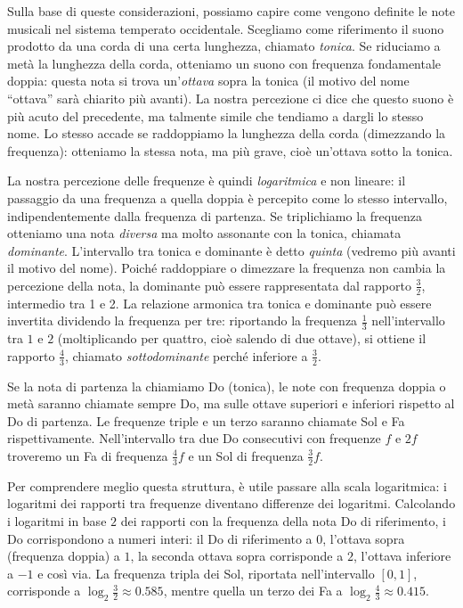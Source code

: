 Sulla base di queste considerazioni, possiamo capire come vengono definite 
le note musicali nel sistema temperato occidentale. 
Scegliamo come riferimento il suono prodotto da una corda di una certa lunghezza, 
chiamato \emph{tonica}. 
Se riduciamo a metà la lunghezza della corda, otteniamo un suono con frequenza fondamentale doppia: 
questa nota si trova un'\emph{ottava} sopra la tonica 
(il motivo del nome ``ottava'' sarà chiarito più avanti). 
La nostra percezione ci dice che questo suono è più acuto del precedente, 
ma talmente simile che tendiamo a dargli lo stesso nome. 
Lo stesso accade se raddoppiamo la lunghezza della corda (dimezzando la frequenza): 
otteniamo la stessa nota, ma più grave, cioè un’ottava sotto la tonica.

La nostra percezione delle frequenze è quindi \emph{logaritmica} e non lineare: 
il passaggio da una frequenza a quella doppia è percepito come lo stesso intervallo, 
indipendentemente dalla frequenza di partenza. 
Se triplichiamo la frequenza otteniamo una nota \emph{diversa} 
ma molto assonante con la tonica, chiamata \emph{dominante}. 
L’intervallo tra tonica e dominante è detto \emph{quinta} 
(vedremo più avanti il motivo del nome). 
Poiché raddoppiare o dimezzare la frequenza non cambia la percezione della nota, 
la dominante può essere rappresentata dal rapporto $\frac 3 2$, intermedio tra 1 e 2. 
La relazione armonica tra tonica e dominante può essere invertita dividendo la frequenza per tre: 
riportando la frequenza $\frac 1 3$ nell’intervallo tra $1$ e $2$ 
(moltiplicando per quattro, cioè salendo di due ottave), 
si ottiene il rapporto $\frac 4 3$, chiamato \emph{sottodominante} 
perché inferiore a $\frac 3 2$.


Se la nota di partenza la chiamiamo Do (tonica), 
le note con frequenza doppia o metà saranno chiamate sempre Do, 
ma sulle ottave superiori e inferiori rispetto al Do di partenza. 
Le frequenze triple e un terzo saranno chiamate Sol e Fa rispettivamente. 
Nell’intervallo tra due Do consecutivi con frequenze $f$ e $2f$ 
troveremo un Fa di frequenza $\frac 4 3 f$ e un Sol 
di frequenza $\frac 3 2 f$.

Per comprendere meglio questa struttura, è utile passare alla 
scala logaritmica: i logaritmi dei rapporti tra frequenze 
diventano differenze dei logaritmi. 
Calcolando i logaritmi in base $2$ dei rapporti 
con la frequenza della nota Do di riferimento, i Do 
corrispondono a numeri interi: il Do di riferimento a $0$, 
l’ottava sopra (frequenza doppia) a $1$, la seconda ottava sopra 
corrisponde a $2$, l’ottava inferiore a $-1$ e così via. 
La frequenza tripla dei Sol, riportata nell’intervallo $[0,1]$, 
corrisponde a $\log_2\frac 3 2 \approx 0.585$, 
mentre quella un terzo dei Fa a $\log_2 \frac 4 3 \approx 0.415$.

